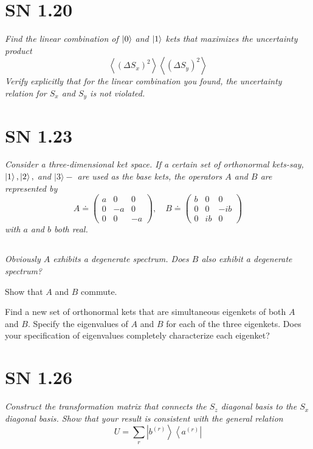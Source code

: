 \documentclass{article}
\begin{document}
\newpage
\section{SN 1.20}
\textit{Find the linear combination of $\ket{0}$ and $\ket{1}$ kets that maximizes the uncertainty product
$$
\left\langle\left(\Delta S_{x}\right)^{2}\right\rangle\left\langle\left(\Delta S_{y}\right)^{2}\right\rangle
$$
Verify explicitly that for the linear combination you found, the uncertainty relation for $S_{x}$ and $S_{y}$ is not violated.}


\newpage

\section{SN 1.23}
\textit{Consider a three-dimensional ket space. If a certain set of orthonormal kets-say, $\ket{1},\ket{2},$ and $|3\rangle-$ are used as the base kets, the operators $A$ and $B$ are represented by
$$
A \doteq\left(\begin{array}{ccc}
a & 0 & 0 \\
0 & -a & 0 \\
0 & 0 & -a
\end{array}\right), \quad B \doteq\left(\begin{array}{ccc}
b & 0 & 0 \\
0 & 0 & -i b \\
0 & i b & 0
\end{array}\right)
$$ with $a$ and $b$ both real.}

\subsection{}
\textit{Obviously $A$ exhibits a degenerate spectrum. Does $B$ also exhibit a degenerate spectrum?}

Show that $A$ and $B$ commute.

Find a new set of orthonormal kets that are simultaneous eigenkets of both $A$ and $B .$ Specify the eigenvalues of $A$ and $B$ for each of the three eigenkets. Does your specification of eigenvalues completely characterize each eigenket?


\newpage
\section{SN 1.26}
\textit{Construct the transformation matrix that connects the $S_{z}$ diagonal basis to the $S_{x}$ diagonal basis. Show that your result is consistent with the general relation
$$
U=\sum_{r}\left|b^{(r)}\right\rangle\left\langle a^{(r)}\right|
$$}
\end{document}
